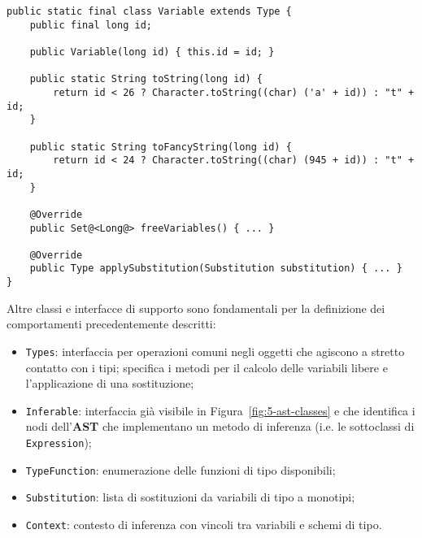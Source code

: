 \begin{lstlisting}[caption={Esempio di sottoclasse di \texttt{Type}}, style=javaCode, label={lst:5-hm-class-java}]
public static final class Variable extends Type {
    public final long id;
    
    public Variable(long id) { this.id = id; }

    public static String toString(long id) {
        return id < 26 ? Character.toString((char) ('a' + id)) : "t" + id;
    }

    public static String toFancyString(long id) {
        return id < 24 ? Character.toString((char) (945 + id)) : "t" + id;
    }

    @Override
    public Set@<Long@> freeVariables() { ... }

    @Override
    public Type applySubstitution(Substitution substitution) { ... }
}
\end{lstlisting}
\vspace{4mm}

\noindent Altre classi e interfacce di supporto sono fondamentali per la definizione dei comportamenti precedentemente descritti:
\begin{itemize}
    \item \texttt{Types}: interfaccia per operazioni comuni negli oggetti che agiscono a stretto contatto con i tipi;
          specifica i metodi per il calcolo delle variabili libere e l'applicazione di una sostituzione;
    \item \texttt{Inferable}: interfaccia già visibile in Figura~\ref{fig:5-ast-classes} e che identifica i nodi
          dell'\textbf{AST} che implementano un metodo di inferenza (i.e. le sottoclassi di \texttt{Expression});
    \item \texttt{TypeFunction}: enumerazione delle funzioni di tipo disponibili;
    \item \texttt{Substitution}: lista di sostituzioni da variabili di tipo a monotipi;
    \item \texttt{Context}: contesto di inferenza con vincoli tra variabili e schemi di tipo.
\end{itemize}

\newpage

